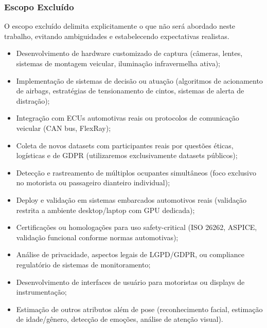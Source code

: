 \documentclass[12pt, a4paper]{article}
\begin{document}
\subsubsection{Escopo Excluído}

O escopo excluído delimita explicitamente o que não será abordado neste trabalho, evitando ambiguidades e estabelecendo expectativas realistas.

\begin{itemize}
    \item Desenvolvimento de hardware customizado de captura (câmeras, lentes, sistemas de montagem veicular, iluminação infravermelha ativa);
    
    \item Implementação de sistemas de decisão ou atuação (algoritmos de acionamento de airbags, estratégias de tensionamento de cintos, sistemas de alerta de distração);
    
    \item Integração com ECUs automotivas reais ou protocolos de comunicação veicular (CAN bus, FlexRay);
    
    \item Coleta de novos datasets com participantes reais por questões éticas, logísticas e de GDPR (utilizaremos exclusivamente datasets públicos);
    
    \item Detecção e rastreamento de múltiplos ocupantes simultâneos (foco exclusivo no motorista ou passageiro dianteiro individual);
    
    \item Deploy e validação em sistemas embarcados automotivos reais (validação restrita a ambiente desktop/laptop com GPU dedicada);
    
    \item Certificações ou homologações para uso safety-critical (ISO 26262, ASPICE, validação funcional conforme normas automotivas);
    
    \item Análise de privacidade, aspectos legais de LGPD/GDPR, ou compliance regulatório de sistemas de monitoramento;
    
    \item Desenvolvimento de interfaces de usuário para motoristas ou displays de instrumentação;
    
    \item Estimação de outros atributos além de pose (reconhecimento facial, estimação de idade/gênero, detecção de emoções, análise de atenção visual).
\end{itemize}
\end{document}
